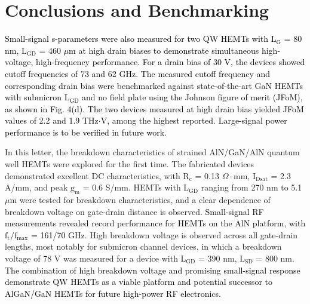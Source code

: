 \documentclass[journal]{IEEEtran}
\begin{document}
\section{Conclusions and Benchmarking}
\textcolor{black}{Small-signal s-parameters were also measured for two QW HEMTs with $\mathrm{L_G}$ = 80 nm, $\mathrm{L_{GD}}$ = 460 $\mu$m at high drain biases to demonstrate simultaneous high-voltage, high-frequency performance. For a drain bias of 30 V, the devices showed cutoff frequencies of 73 and 62 GHz. The measured cutoff frequency and corresponding drain bias were benchmarked against state-of-the-art GaN HEMTs with submicron $\mathrm{L_{GD}}$ and no field plate \cite{Shinohara2010,Shinohara2011,Shinohara2011a,Shinohara2012,Tang2015,Chung2009,Chung2010,Lee2013,Palacios2006a,Palacios2006b,Dasgupta2009,Nidhi2012,Denninghoff2012,Denninghoff2012a,Denninghoff2013,Romanczyk2018,Snider2012,Yue2013,Guo2013,Saunier2012} using the Johnson figure of merit (JFoM), as shown in Fig. 4(d). The two devices measured at high drain bias yielded JFoM values of 2.2 and 1.9 THz$\cdot$V, among the highest reported. Large-signal power performance is to be verified in future work.}

In this letter, the breakdown characteristics of strained AlN/GaN/AlN quantum well HEMTs were explored for the first time. The fabricated devices demonstrated excellent DC characteristics, with $\mathrm{R_c}$ = 0.13 $\Omega\cdot$mm, $\mathrm{I_{Dsat}}$ = 2.3 A/mm, and peak $\mathrm{g_m}$ = 0.6 S/mm. HEMTs with $\mathrm{L_{GD}}$ ranging from 270 nm to 5.1 $\mu$m were tested for breakdown characteristics, and a clear dependence of breakdown voltage on gate-drain distance is observed. \textcolor{black}{Small-signal RF measurements revealed record performance for HEMTs on the AlN platform, with $\mathrm{f_t/f_{max}}$ = 161/70 GHz.} High breakdown voltage is observed across all gate-drain lengths, most notably for submicron channel devices, in which a breakdown voltage of 78 V was measured for a device with $\mathrm{L_{GD}}$ = 390 nm, $\mathrm{L_{SD}}$ = 800 nm. \textcolor{black}{The combination of high breakdown voltage and promising small-signal response demonstrate QW HEMTs as a viable platform and potential successor to AlGaN/GaN HEMTs for future high-power RF electronics.}

\vfill

{\color{white}
\pagebreak
}


%


\end{document}

